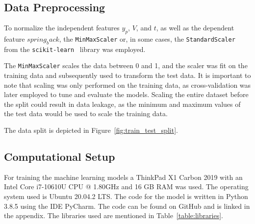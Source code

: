 \subsection{Data Preprocessing}\label{subsec:data-preprocessing}
To normalize the independent features $y_p$, $V$, and $t$, as well as the dependent feature $spring_back$, the
\texttt{MinMaxScaler} or, in some cases, the \texttt{StandardScaler} from the
\texttt{scikit-learn}~\cite{scikit -learn} library was employed.

The \texttt{MinMaxScaler} scales the data between 0 and 1, and the scaler was fit on the training data and
subsequently used to transform the test data. It is important to note that scaling was only performed on the training
data, as cross-validation was later employed to tune and evaluate the models. Scaling the entire dataset before the
split could result in data leakage, as the minimum and maximum values of the test data would be used to scale the
training data.

The data split is depicted in Figure~\ref{fig:train_test_split}.

\subsection{Computational Setup}\label{subsec:computational-setup}
For training the machine learning models a ThinkPad X1 Carbon 2019 with an
Intel Core i7-10610U CPU @ 1.80GHz and 16 GB RAM was used.
The operating system used is Ubuntu 20.04.2 LTS. The code for the model is
written in Python 3.8.5 using the IDE PyCharm.
The code can be found on GitHub and is linked in the appendix.
The libraries used are mentioned in Table~\ref{table:libraries}.

\captionsetup{width=1\textwidth}

